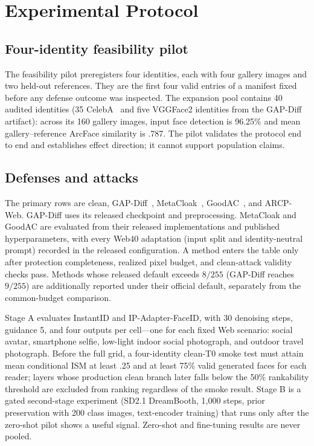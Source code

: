 \section{Experimental Protocol}
\label{sec:experiments}

\subsection{Four-identity feasibility pilot}
The feasibility pilot preregisters four identities, each with four gallery
images and two held-out references. They are the first four valid entries of a
manifest fixed before any defense outcome was inspected. The expansion pool
contains 40 audited identities (35
CelebA~\cite{liu2015deep}
and five VGGFace2 identities from the GAP-Diff artifact): across its 160 gallery
images, input face detection is 96.25\% and mean gallery--reference ArcFace
similarity is .787. The pilot validates the protocol end to end and
establishes effect direction; it cannot support population claims.

\subsection{Defenses and attacks}
The primary rows are clean, GAP-Diff~\cite{zhu2025gapdiff},
MetaCloak~\cite{liu2023metacloak}, GoodAC~\cite{xu2025goodac}, and ARCP-Web.
GAP-Diff uses its released checkpoint and preprocessing. MetaCloak and GoodAC
are evaluated from their released implementations and published
hyperparameters, with every Web40 adaptation (input split and
identity-neutral prompt) recorded in the released configuration. A method
enters the table only after protection completeness, realized pixel budget,
and clean-attack validity checks pass. Methods whose released default exceeds
$8/255$ (GAP-Diff reaches $9/255$) are additionally reported under their
official default, separately from the common-budget comparison.

Stage A evaluates InstantID and IP-Adapter-FaceID, with 30
denoising steps, guidance 5, and four outputs per cell---one for each fixed
Web scenario: social avatar, smartphone selfie, low-light indoor social
photograph, and outdoor travel photograph. Before the full grid, a
four-identity clean-T0 smoke test must attain mean conditional ISM at least
.25 and at least 75\% valid generated faces for each reader; layers whose
production clean branch later falls below the 50\% rankability threshold are
excluded from ranking regardless of the smoke result. Stage B is a gated
second-stage experiment (SD2.1 DreamBooth, 1,000 steps, prior preservation
with 200 class images, text-encoder training) that runs only after the
zero-shot pilot shows a useful signal. Zero-shot and fine-tuning results are
never pooled.

